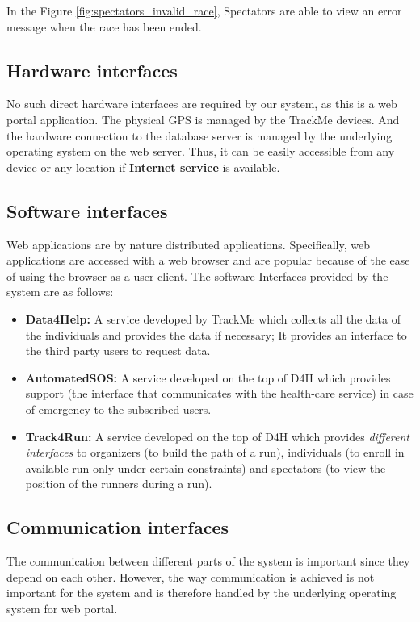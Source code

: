\documentclass[a4paper, hidelinks, 12pt]{report}
\begin{document}
	In the Figure \ref{fig:spectators_invalid_race}, Spectators are able to view an error message when the race has been ended. 

	\subsection{Hardware interfaces}
	No such direct hardware interfaces are required by our system, as this is a web portal application. The physical GPS is managed by the TrackMe devices. And the hardware connection to the database server is managed by the underlying operating system on the web server. Thus, it can be easily accessible from any device or any location if \textbf{Internet service} is available.
	
	\subsection{Software interfaces}
	Web applications are by nature distributed applications. Specifically, web applications are accessed with a web browser and are popular because of the ease of using the browser as a user client. The software Interfaces provided by the system are as follows:\\
	
	\begin{itemize}
		\item{} \textbf{Data4Help:} A service developed by TrackMe which collects all the data of the individuals and provides the data if necessary; It provides an interface to the third party users to request data.
		\item{} \textbf{AutomatedSOS:} A service developed on the top of D4H which provides support (the interface that communicates with the health-care service) in case of emergency to the subscribed users.
		\item{} \textbf{Track4Run:} A service developed on the top of D4H  which provides \textit{different interfaces} to organizers (to build the path of a run), individuals (to enroll in available run only under certain constraints) and spectators (to view the position of the runners during a run).
	\end{itemize}
	
	\subsection{Communication interfaces}
	The communication between different parts of the system is important since they depend on each other. However, the way communication is achieved is not important for the system and is therefore handled by the underlying operating system for web portal.
	
\end{document}
